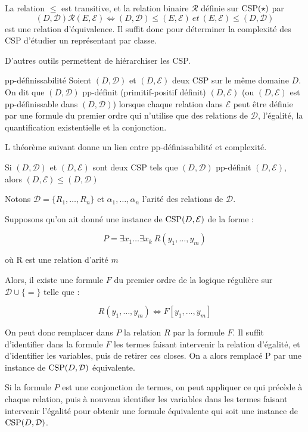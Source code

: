 \begin{prop}
La relation $\leq$ est transitive, et la relation binaire $\mathcal{R}$ définie sur $\text{CSP} (\star)$ par 
$$(D,\mathcal{D}) \mathcal{R} (E,\mathcal{E}) \iff (D,\mathcal{D}) \leq (E,\mathcal{E}) \ et \ (E,\mathcal{E}) \leq (D,\mathcal{D})$$
est une relation d'équivalence. Il suffit donc pour déterminer la complexité des CSP d'étudier un représentant par classe.
\end{prop}

D'autres outils permettent de hiérarchiser les CSP.

\begin{defi}{pp-définissabilité}
Soient $(D,\mathcal{D})$ et $(D,\mathcal{E})$ deux CSP sur le même domaine $D$. On dit que $(D,\mathcal{D})$ pp-définit (primitif-positif définit) $(D,\mathcal{E})$ (ou $(D,\mathcal{E})$ est pp-définissable dans $(D,\mathcal{D})$) lorsque chaque relation dans $\mathcal{E}$ peut être définie par une formule du premier ordre qui n'utilise que des relations de $\mathcal{D}$, l'égalité, la quantification existentielle et la conjonction.
\end{defi}

L théorème suivant donne un lien entre pp-définissabilité et complexité.

\begin{theo}{}
Si  $(D,\mathcal{D})$ et $(D,\mathcal{E})$ sont deux CSP tels que  $(D,\mathcal{D})$ pp-définit $(D,\mathcal{E})$, alors $(D,\mathcal{E}) \leq (D,\mathcal{D})$
\end{theo}

\begin{pv}
Notons $\mathcal{D} = \{R_1,\dots,R_n\}$ et $\alpha_1,\dots,\alpha_n$ l'arité des relations de $\mathcal{D}$. 

Supposons qu'on ait donné une instance de $\text{CSP} (D,\mathcal{E})$ de la forme :

$$P = \exists x_1 \dots \exists x_k \ R(y_1,\dots,y_m)$$

où R est une relation d'arité $m$

Alors, il existe une formule $F$ du premier ordre de la logique régulière sur $\mathcal{D} \cup \{=\}$ telle que :

$$ R(y_1,\dots,y_m) \iff F[y_1,\dots,y_m]$$

On peut donc remplacer dans $P$ la relation $R$ par la formule $F$. Il suffit d'identifier dans la formule $F$ les termes faisant intervenir la relation d'égalité, et d'identifier les variables, puis de retirer ces closes. On a alors remplacé P par une instance de $\text{CSP} (D,\mathcal{D})$ équivalente.

Si la formule $P$ est une conjonction de termes, on peut appliquer ce qui précède à chaque relation, puis à nouveau identifier les variables dans les termes faisant intervenir l'égalité pour obtenir une formule équivalente qui soit une instance de $\text{CSP} (D,\mathcal{D})$. 
\end{pv}

